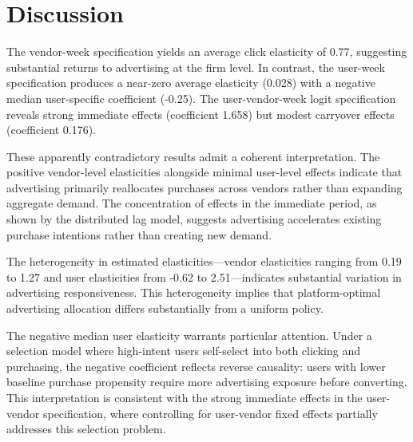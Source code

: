 \section*{Discussion}

The vendor-week specification yields an average click elasticity of 0.77, suggesting substantial returns to advertising at the firm level. In contrast, the user-week specification produces a near-zero average elasticity (0.028) with a negative median user-specific coefficient (-0.25). The user-vendor-week logit specification reveals strong immediate effects (coefficient 1.658) but modest carryover effects (coefficient 0.176).

These apparently contradictory results admit a coherent interpretation. The positive vendor-level elasticities alongside minimal user-level effects indicate that advertising primarily reallocates purchases across vendors rather than expanding aggregate demand. The concentration of effects in the immediate period, as shown by the distributed lag model, suggests advertising accelerates existing purchase intentions rather than creating new demand.

The heterogeneity in estimated elasticities—vendor elasticities ranging from 0.19 to 1.27 and user elasticities from -0.62 to 2.51—indicates substantial variation in advertising responsiveness. This heterogeneity implies that platform-optimal advertising allocation differs substantially from a uniform policy.

The negative median user elasticity warrants particular attention. Under a selection model where high-intent users self-select into both clicking and purchasing, the negative coefficient reflects reverse causality: users with lower baseline purchase propensity require more advertising exposure before converting. This interpretation is consistent with the strong immediate effects in the user-vendor specification, where controlling for user-vendor fixed effects partially addresses this selection problem.